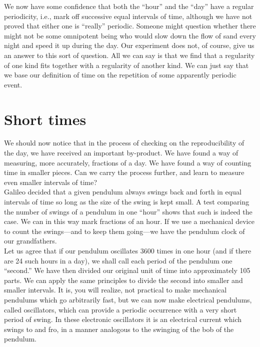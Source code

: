 \documentclass{article}
\begin{document}
	We now have some confidence that both the “hour” and the “day” have a regular periodicity, i.e., mark off successive equal intervals of time, although we have not proved that either one is “really” periodic. Someone might question whether there might not be some omnipotent being who would slow down the flow of sand every night and speed it up during the day. Our experiment does not, of course, give us an answer to this sort of question. All we can say is that we find that a regularity of one kind fits together with a regularity of another kind. We can just say that we base our definition of time on the repetition of some apparently periodic event.\\

	\section{Short times}

	We should now notice that in the process of checking on the reproducibility of the day, we have received an important by-product. We have found a way of measuring, more accurately, fractions of a day. We have found a way of counting time in smaller pieces. Can we carry the process further, and learn to measure even smaller intervals of time?\\

	Galileo decided that a given pendulum always swings back and forth in equal intervals of time so long as the size of the swing is kept small. A test comparing the number of swings of a pendulum in one “hour” shows that such is indeed the case. We can in this way mark fractions of an hour. If we use a mechanical device to count the swings—and to keep them going—we have the pendulum clock of our grandfathers.\\

	Let us agree that if our pendulum oscillates 3600 times in one hour (and if there are 24 such hours in a day), we shall call each period of the pendulum one “second.” We have then divided our original unit of time into approximately 105 parts. We can apply the same principles to divide the second into smaller and smaller intervals. It is, you will realize, not practical to make mechanical pendulums which go arbitrarily fast, but we can now make electrical pendulums, called oscillators, which can provide a periodic occurrence with a very short period of swing. In these electronic oscillators it is an electrical current which swings to and fro, in a manner analogous to the swinging of the bob of the pendulum.\\
\end{document}
